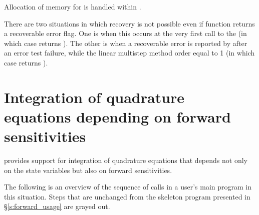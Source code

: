 {
  Allocation of memory for  is handled within {\cvodes}.

  There are two situations in which recovery is not possible even if 
  function returns a recoverable error flag.  One is when this occurs
  at the very first call to the  (in which case {\cvodes} returns
  ).  The other is when a recoverable error is reported
  by  after an error test failure, while the linear multistep method
  order  equal to 1 (in which case {\cvodes} returns ).
}



\section{Integration of quadrature equations depending on forward sensitivities}
\label{s:forward_quad_usage}

{\cvodes} provides support for integration of quadrature equations that depends not only 
on the state variables but also on forward sensitivities.

The following is an overview of the sequence of calls in a user's main program in 
this situation. Steps that are unchanged from the skeleton program presented in 
\S\ref{s:forward_usage} are grayed out.

